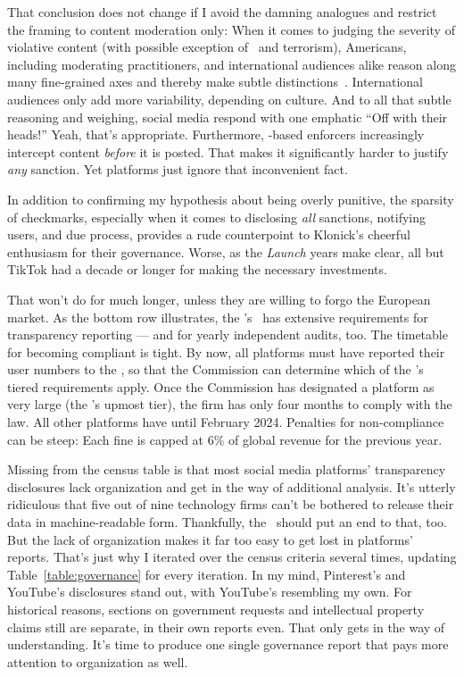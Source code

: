 That conclusion does not change if I avoid the damning analogues and restrict
the framing to content moderation only: When it comes to judging the severity of
violative content (with possible exception of \CSAM\ and terrorism), Americans,
including moderating practitioners, and international audiences alike reason
along many fine-grained axes and thereby make subtle
distinctions~\cite{JiangScheuermanea2021,ScheuermanJiangea2021}. International
audiences only add more variability, depending on culture. And to all that
subtle reasoning and weighing, social media respond with one emphatic ``Off with
their heads!'' Yeah, that's appropriate. Furthermore, \AI{}-based enforcers
increasingly intercept content \emph{before} it is posted. That makes it
significantly harder to justify \emph{any} sanction. Yet platforms just ignore
that inconvenient fact.

In addition to confirming my hypothesis about being overly punitive, the
sparsity of checkmarks, especially when it comes to disclosing \emph{all}
sanctions, notifying users, and due process, provides a rude counterpoint to
Klonick's cheerful enthusiasm for their governance. Worse, as the \emph{Launch}
years make clear, all but TikTok had a decade or longer for making the necessary
investments.

That won't do for much longer, unless they are willing to forgo the European
market. As the bottom row illustrates, the \EU's \DSA\ has extensive
requirements for transparency reporting --- and for yearly independent audits,
too. The timetable for becoming compliant is tight. By now, all platforms must
have reported their user numbers to the \EU, so that the Commission can
determine which of the \DSA's tiered requirements apply. Once the Commission has
designated a platform as very large (the \DSA's upmost tier), the firm has only
four months to comply with the law. All other platforms have until February
2024. Penalties for non-compliance can be steep: Each fine is capped at 6\% of
global revenue for the previous year.

Missing from the census table is that most social media platforms' transparency
disclosures lack organization and get in the way of additional analysis. It's
utterly ridiculous that five out of nine technology firms can't be bothered to
release their data in machine-readable form. Thankfully, the \DSA\ should put an
end to that, too. But the lack of organization makes it far too easy to get lost
in platforms' reports. That's just why I iterated over the census criteria
several times, updating Table~\ref{table:governance} for every iteration. In my
mind, Pinterest's and YouTube's disclosures stand out, with YouTube's resembling
my own. For historical reasons, sections on government requests and intellectual
property claims still are separate, in their own reports even. That only gets in
the way of understanding. It's time to produce one single governance report that
pays more attention to organization as well.

